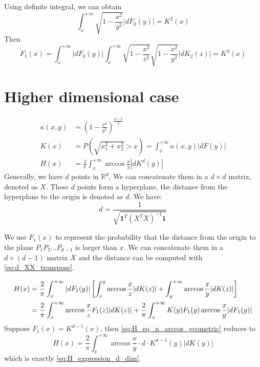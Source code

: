\documentclass{article}
\begin{document}
Using definite integral, we can obtain
\begin{equation}
    \int_x^{+\infty} \sqrt{1-\frac{x^2}{y^2}}
    |dF_0(y)| = K^2(x)
\end{equation}
Then
\begin{equation}
    F_1(x) = \int_x^{+\infty} |dF_0(y)|
    \int_x^{+\infty} \sqrt{1-\frac{x^2}{z^2}}
    \sqrt{1-\frac{x^2}{y^2}} |dK_2(z)|
    = K^3(x)
\end{equation}

\section{Higher dimensional case}

\begin{align}
    \kappa(x,y) & =(1-\frac{x^2}{y^2})^{\frac{d-2}{2}}\\
    K(x) &=P(\sqrt{x_1^2+x_2^2}>x)= \int_x^{+\infty} \kappa(x,y)|dF(y)| \\
    H(x) &= \frac{2}{\pi}
    \int_x^{+\infty} \arccos\frac{x}{y}
    |d K^d(y)|\label{eq:H_expression_d_dim}
\end{align}
Generally, we have $d$ points in $\mathbb{R}^d$, We
can concatenate them
in a $d\times d$ matrix, denoted as $X$.
These $d$ points form a hyperplane,
the distance from the hyperplane to the origin is denoted as $d$.
We have:
\begin{equation}\label{eq:d_XX_transpose}
    d = \frac{1}{\sqrt{\mathbf{1}^T (X^T X)^{-1} \mathbf{1}}}
\end{equation}

We use $F_1(x)$ to represent the probability that
the distance from the origin to the plane $P_1P_2\dots P_{d-1}$
is larger than $x$. We can concatenate them in a $d \times (d-1)$ matrix $X$
and the distance can be computed with \eqref{eq:d_XX_transpose}.

\begin{align}\label{eq:H_eq_n_arccos_geometric}
    H(x) &= \frac{2}{\pi}\int_x^{+\infty}|dF_1(y)|
    \left[ \int_x^y \arccos\frac{x}{z}|dK(z)|
    +\int_y^{+\infty}\arccos\frac{x}{y} |dK(z)|\right]\\
    &=\frac{2}{\pi}\int_x^{+\infty} \arccos\frac{x}{z}
    F_1(z)|dK(z)|+\frac{2}{\pi}\int_{x}^{+\infty} K(y)F_1(y)\arccos\frac{x}{y}|dF_1(y)| \notag 
\end{align}
Suppose $F_1(x)=K^{d-1}(x)$,
then \eqref{eq:H_eq_n_arccos_geometric} reduces to
$$
H(x) = \frac{2}{\pi}\int_x^{+\infty}  \arccos\frac{x}{y}\cdot
d\cdot  K^{d-1}(y) |dK(y)|
$$
which is exactly \eqref{eq:H_expression_d_dim}.
\end{document}
